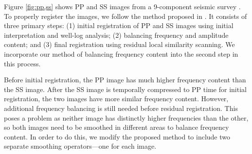         Figure \ref{fig:pp,ss} shows PP and SS images from a 9-component seismic survey \cite[]{attr}.
        To properly register the images, we follow the
        method proposed in \cite{warp}. It consists of three primary steps: (1) initial registration
        of PP and SS images using initial interpretation and well-log analysis; (2) balancing
        frequency and amplitude content; and (3) final registration using residual local similarity
        scanning. We incorporate our method of balancing frequency content into the second step in
        this process.

        Before initial registration, the PP image has much higher frequency content than the SS
        image. After the SS image is temporally compressed to PP time for initial registration, the
        two images have more similar frequency content. However, additional frequency balancing is
        still needed before residual registration. This poses a problem as neither image has
        distinctly higher frequencies than the other, so both images need to be smoothed in
        different areas to balance frequency content. In order to do this, we modify the proposed
        method to include two separate smoothing operators---one for each image.


